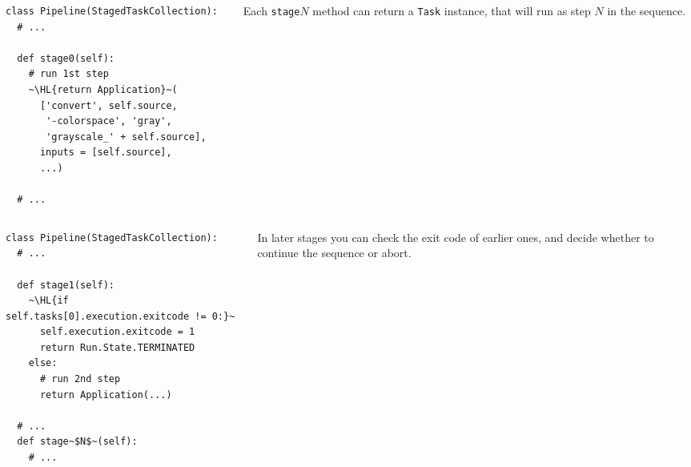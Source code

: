 \documentclass[english,serif,mathserif,xcolor=pdftex,dvipsnames,table]{beamer}
\begin{document}
\begin{frame}[fragile]
  \begin{columns}[c]
    \begin{column}{0.6\textwidth}
      \begin{lstlisting}
class Pipeline(StagedTaskCollection):
  # ...

  def stage0(self):
    # run 1st step
    ~\HL{return Application}~(
      ['convert', self.source,
       '-colorspace', 'gray',
       'grayscale_' + self.source],
      inputs = [self.source],
      ...)

  # ...
      \end{lstlisting}
    \end{column}
    \begin{column}{0.4\textwidth}
      \raggedleft

      Each \texttt{stage$N$} method can return a \texttt{Task}
      instance, that will run as step $N$ in the sequence.
    \end{column}
  \end{columns}
\end{frame}


\begin{frame}[fragile]
  \begin{columns}[c]
    \begin{column}{0.6\textwidth}
      \begin{lstlisting}
class Pipeline(StagedTaskCollection):
  # ...

  def stage1(self):
    ~\HL{if self.tasks[0].execution.exitcode != 0:}~
      self.execution.exitcode = 1
      return Run.State.TERMINATED
    else:
      # run 2nd step
      return Application(...)

  # ...
  def stage~$N$~(self):
    # ...
      \end{lstlisting}
    \end{column}
    \begin{column}{0.4\textwidth}
      \raggedleft

      \+\+\+\+\+
      In later stages you can check the exit code of
      earlier ones, and decide whether to continue the sequence or
      abort.
    \end{column}
  \end{columns}
\end{frame}
\end{document}
